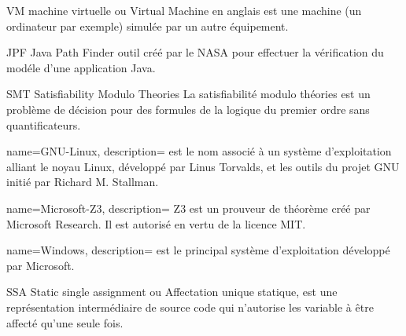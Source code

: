 


    {VM}
    {machine virtuelle}
    { ou Virtual Machine en anglais est une machine (un ordinateur par exemple) simulée par un autre équipement.}
    
    {JPF}
    {Java Path Finder}
    { outil créé par le NASA pour effectuer la vérification du modéle d'une application Java.}
    
    {SMT}
    {Satisfiability Modulo Theories}
    { La satisfiabilité modulo théories est un problème de décision pour des formules de la logique du premier ordre sans quantificateurs.}

{
        name=GNU-Linux,
        description={ est le nom associé à un système d'exploitation alliant le noyau Linux, développé par Linus Torvalds, et les outils du projet GNU initié par Richard M. Stallman.}
}

{
        name=Microsoft-Z3,
        description={ Z3 est un prouveur de théorème créé par Microsoft Research. Il est autorisé en vertu de la licence MIT.}
}

{
        name=Windows,
        description={ est le principal système d'exploitation développé par Microsoft.}
}


	{SSA}
	{Static single assignment}
	{ ou Affectation unique statique, est une représentation intermédiaire de source code qui n'autorise les variable à être affecté qu'une seule fois.}